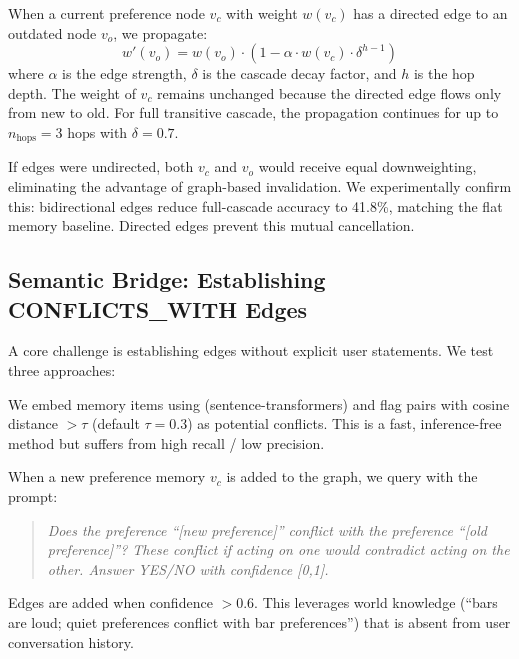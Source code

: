 When a current preference node $v_c$ with weight $w(v_c)$ has a directed \conflictswith edge to an outdated node $v_o$, we propagate:
\begin{equation}
    w'(v_o) = w(v_o) \cdot \left(1 - \alpha \cdot w(v_c) \cdot \delta^{h-1}\right)
    \label{eq:drift_cascade}
\end{equation}
where $\alpha$ is the edge strength, $\delta$ is the cascade decay factor, and $h$ is the hop depth. The weight of $v_c$ remains unchanged because the directed edge flows only from new to old. For full transitive cascade, the propagation continues for up to $n_{\text{hops}} = 3$ hops with $\delta = 0.7$.

If \conflictswith edges were undirected, both $v_c$ and $v_o$ would receive equal downweighting, eliminating the advantage of graph-based invalidation. We experimentally confirm this: bidirectional edges reduce full-cascade accuracy to 41.8\%, matching the flat memory baseline. Directed edges prevent this mutual cancellation.

\subsection{Semantic Bridge: Establishing CONFLICTS\_WITH Edges}
\label{sec:method:semantic}

A core challenge is establishing \conflictswith edges without explicit user statements. We test three approaches:

We embed memory items using \miniLM (sentence-transformers) and flag pairs with cosine distance $> \tau$ (default $\tau = 0.3$) as potential conflicts. This is a fast, inference-free method but suffers from high recall / low precision.

When a new preference memory $v_c$ is added to the graph, we query \gptfouromini with the prompt:
\begin{quote}
\small\textit{Does the preference ``[new preference]'' conflict with the preference ``[old preference]''? These conflict if acting on one would contradict acting on the other. Answer YES/NO with confidence [0,1].}
\end{quote}
Edges are added when confidence $> 0.6$. This leverages world knowledge (``bars are loud; quiet preferences conflict with bar preferences'') that is absent from user conversation history.

